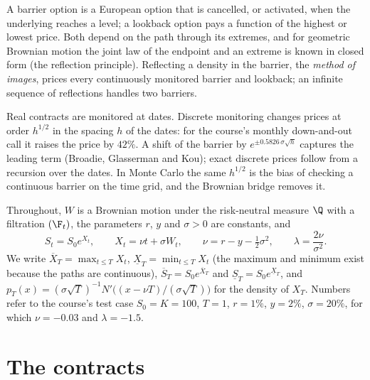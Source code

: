 
A barrier option is a European option that is cancelled, or activated, when the underlying
reaches a level; a lookback option pays a function of the highest or lowest price. Both depend
on the path through its extremes, and for geometric Brownian motion the joint law of the
endpoint and an extreme is known in closed form (the reflection principle). Reflecting a
density in the barrier, the \emph{method of images}, prices every continuously monitored
barrier and lookback; an infinite sequence of reflections handles two barriers.

Real contracts are monitored at dates. Discrete monitoring changes prices at order $h^{1/2}$ in
the spacing $h$ of the dates: for the course's monthly down-and-out call it raises the price by
$42\%$. A shift of the barrier by $e^{\pm0.5826\,\sigma\sqrt h}$ captures the leading term
(Broadie, Glasserman and Kou); exact discrete prices follow from a recursion over the dates. In
Monte Carlo the same $h^{1/2}$ is the bias of checking a continuous barrier on the time grid,
and the Brownian bridge removes it.

Throughout, $W$ is a Brownian motion under the risk-neutral measure $\Q$ with a filtration
$(\F_t)$, the parameters $r$, $y$ and $\sigma>0$ are constants, and
\begin{equation}\label{eq:bar-X}
  S_t=S_0e^{X_t},\qquad X_t=\nu t+\sigma W_t,\qquad \nu=r-y-\tfrac12\sigma^2,\qquad \lambda=\frac{2\nu}{\sigma^2}.
\end{equation}
We write $\overline X_T=\max_{t\le T}X_t$, $\underline X_T=\min_{t\le T}X_t$ (the maximum and
minimum exist because the paths are continuous), $\overline S_T=S_0e^{\overline X_T}$ and
$\underline S_T=S_0e^{\underline X_T}$, and $p_T(x)=(\sigma\sqrt T)^{-1}N'\big((x-\nu T)/(\sigma\sqrt T)\big)$ for
the density of $X_T$. Numbers refer to the course's test case $S_0=K=100$, $T=1$, $r=1\%$,
$y=2\%$, $\sigma=20\%$, for which $\nu=-0.03$ and $\lambda=-1.5$.

\section{The contracts}\label{sec:bar-contracts}

